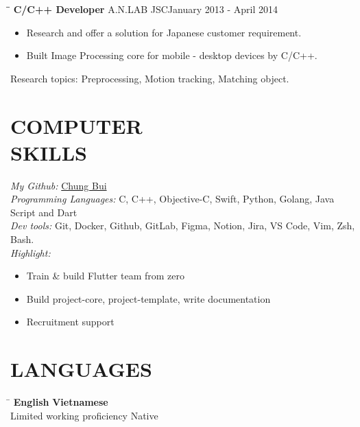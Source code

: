 \documentclass[margin, 10pt]{res}
\begin{document}
\begin{resume}
\begin{itemize}
   \end{itemize}

   \begin{tabbing}
   \hspace{2.0in}\= \hspace{2.0in}\= \kill %
   {\bf C/C++ Developer} \>A.N.LAB JSC\>January 2013 - April 2014\\
   \end{tabbing}\vspace{-20pt} %

   \begin{itemize}
   		\item Research and offer a solution for Japanese customer requirement. 
		\item Built Image Processing core for mobile - desktop devices by C/C++.		
		
   \end{itemize}
   Research topics: Preprocessing, Motion tracking, Matching object.
	
\section{COMPUTER \\ SKILLS}
	{\sl My Github:} {\color{blue}\href{https://github.com/chungbd}{Chung Bui}}\\
	{\sl Programming Languages:} C, C++, Objective-C, Swift, Python, Golang, Java Script and Dart\\
	{\sl Dev tools:} Git, Docker, Github, GitLab, Figma, Notion, Jira, VS Code, Vim, Zsh, Bash.\\
	{\sl Highlight:}
	\begin{itemize}
		\item Train \& build Flutter team from zero
		\item Build project-core, project-template, write documentation
		\item Recruitment support
	\end{itemize}

\section{LANGUAGES}
	\vspace{-0.1in}
	\begin{tabbing}
    \hspace{2.8in}\= \kill %
    \textbf{English}            \> \textbf{Vietnamese}\\
    Limited working proficiency \> Native\\
	\end{tabbing}\vspace{-20pt}
	

\end{resume}
\end{document}
